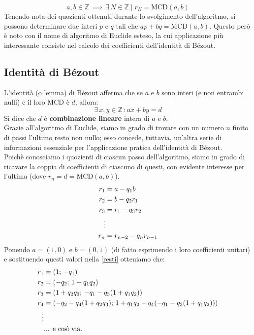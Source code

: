 \documentclass[a4paper,12pt]{article}
\begin{document}
\begin{equation}
    a,b \in \mathbb{Z} \,\implies \, \exists \, N\in \mathbb{Z} \mid r_N = \text{MCD}(a,b)
\end{equation}
Tenendo nota dei quozienti ottenuti durante lo svolgimento dell'algoritmo, si possono determinare due interi $p$ e $q$ tali che $ap+bq=\text{MCD}(a,b)$. Questo però è noto con il nome di algoritmo di Euclide esteso, la cui applicazione più interessante consiste nel calcolo dei coefficienti dell'identità di B\'ezout.\\

\subsection{Identità di B\'ezout}
L'identità (o lemma) di Bézout afferma che se $a$ e $b$ sono interi (e non entrambi nulli) e il loro MCD è $d$, allora:
\begin{equation}\label{Bezout}
\exists \, x,y \in \mathbb{Z} \, : ax+by=d
\end{equation}
Si dice che $d$ è \textbf{combinazione lineare} intera di $a$ e $b$.\\
Grazie all'algoritmo di Euclide, siamo in grado di trovare con un numero $n$ finito di passi l'ultimo resto non nullo; esso concede, tuttavia, un'altra serie di informazioni essenziale per l'applicazione pratica dell'identità di B\'ezout.\\
Poichè conosciamo i quozienti di ciascun passo dell'algoritmo, siamo in grado di ricavare la coppia di coefficienti di ciascuno di questi, con evidente interesse per l'ultima (dove $r_n=d=\text{MCD}(a,b)$).
\begin{equation} \label{resti}
\begin{split}
r_1 & = a - q_1 b \\
r_2 & = b - q_2 r_1 \\
r_3 & = r_1 - q_3 r_2 \\
\hspace{-4em}\vdots \\
r_n & = r_{n-2} - q_n r_{n-1}
\end{split}
\end{equation}
Ponendo $a=(1,0)$ e $b=(0,1)$ (di fatto esprimendo i loro coefficienti unitari) e sostituendo questi valori nella \eqref{resti} otteniamo che:
\begin{equation} \label{coefficienti}
\begin{split}
r_1 & = (1;\, -q_1) \\
r_2 & = (-q_2;\, 1+q_1 q_2) \\
r_3 & = (1+q_2 q_3;\, -q_1 -q_3(1+q_1 q_2)) \\
r_4 & = (-q_2 -q_4(1+q_2 q_3);\, 1+q_1 q_2 -q_4(-q_1 -q_3(1+q_1 q_2))) \\
\hspace{-4em}\vdots \\
& \text{... e così via.}
\end{split}
\end{equation}
\end{document}
